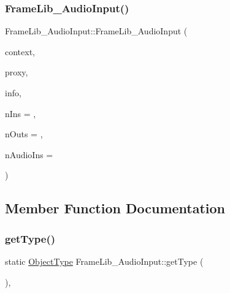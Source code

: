 \subsubsection{\texorpdfstring{Frame\+Lib\+\_\+\+Audio\+Input()}{FrameLib\_AudioInput()}}
{\footnotesize\ttfamily Frame\+Lib\+\_\+\+Audio\+Input\+::\+Frame\+Lib\+\_\+\+Audio\+Input (\begin{DoxyParamCaption}\item[{\hyperlink{class_frame_lib___context}{Frame\+Lib\+\_\+\+Context}}]{context,  }\item[{\hyperlink{struct_frame_lib___proxy}{Frame\+Lib\+\_\+\+Proxy} $\ast$}]{proxy,  }\item[{\hyperlink{class_frame_lib___parameters_1_1_info}{Frame\+Lib\+\_\+\+Parameters\+::\+Info} $\ast$}]{info,  }\item[{unsigned long}]{n\+Ins = {},  }\item[{unsigned long}]{n\+Outs = {},  }\item[{unsigned long}]{n\+Audio\+Ins = {} }\end{DoxyParamCaption})\hspace{0.3cm}{\ttfamily [inline]}}



\subsection{Member Function Documentation}
\mbox{\label{class_frame_lib___audio_input_a8a6f94b1530b3fd5b604d3151fad5220}} 
\subsubsection{\texorpdfstring{get\+Type()}{getType()}}
{\footnotesize\ttfamily static \hyperlink{_frame_lib___types_8h_a842c5e2e69277690b064bf363c017980}{Object\+Type} Frame\+Lib\+\_\+\+Audio\+Input\+::get\+Type (\begin{DoxyParamCaption}{ }\end{DoxyParamCaption})\hspace{0.3cm}{\ttfamily [inline]}, {\ttfamily [static]}}

\mbox{\label{class_frame_lib___audio_input_ad0586445ce01e95a3c832ecdc5dc1200}} 
